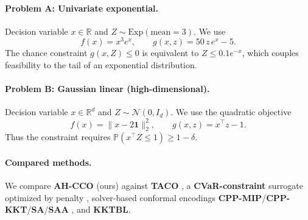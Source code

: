 \documentclass{uai2026} %
\theoremstyle{plain}
\theoremstyle{definition}
\begin{document}
\paragraph{Problem A: Univariate exponential.}
Decision variable $x\in\mathbb{R}$ and $Z\sim\mathrm{Exp}(\text{mean}=3)$.
We use
\[
  f(x)=x^3 e^x,
  \qquad
  g(x,z)=50\,z\,e^x-5.
\]
The chance constraint $g(x,Z)\le 0$ is equivalent to $Z \le 0.1e^{-x}$, which couples feasibility to the tail of an exponential distribution.

\paragraph{Problem B: Gaussian linear (high-dimensional).}
Decision variable $x\in\mathbb{R}^d$ and $Z\sim\mathcal{N}(0,I_d)$.
We use the quadratic objective
\[
  f(x)=\|x-2\mathbf{1}\|_2^2,
  \qquad
  g(x,z)=x^\top z-1.
\]
Thus the constraint requires $\mathbb{P}(x^\top Z\le 1)\ge 1-\delta$.

\paragraph{Compared methods.}
We compare \textbf{AH-CCO} (ours) against \textbf{TACO} \citep{laguelmalickackooij2021bilevel}, a \textbf{CVaR-constraint} surrogate optimized by penalty \citep{rockafellaruryasev2000cvar}, solver-based conformal encodings \textbf{CPP-MIP}/\textbf{CPP-KKT}/\textbf{SA}/\textbf{SAA} \citep{zhao2024conformal}, and \textbf{KKTBL}.
\end{document}
